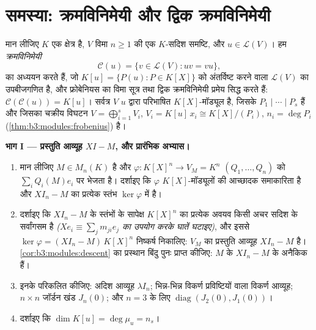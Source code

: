 \section{समस्या: क्रमविनिमेयी और द्विक क्रमविनिमेयी}

\begin{problem}\label{pb:b3:modules:1}
मान लीजिए $K$ एक क्षेत्र है, $V$ विमा $n \geq
1$ की एक
$K$-सदिश समष्टि, और $u \in \mathcal L(V)$। हम \emph{क्रमविनिमेयी}
\[
\mathcal C(u) = \{v \in \mathcal L(V) : uv = vu\},
\]
का अध्ययन करते हैं, जो $K[u] = \{P(u) : P \in
K[X]\}$ को अंतर्विष्ट करने वाला $\mathcal L(V)$ का
उपबीजगणित है, और फ्रोबेनियस का विमा सूत्र तथा द्विक क्रमविनिमेयी
प्रमेय सिद्ध करते हैं: $\mathcal C(\mathcal C(u)) = K[u]$। सर्वत्र $V$ $u$ द्वारा
परिभाषित $K[X]$-मॉड्यूल है, जिसके  $P_1 \mid \cdots \mid P_s$ हैं और
जिसका चक्रीय विघटन $V =
\bigoplus_{i=1}^s V_i$, $V_i = K[u]\,x_i \cong K[X]/(P_i)$, $n_i
= \deg P_i$ (\cref{thm:b3:modules:frobenius}) है।

\medskip
\noindent\textbf{भाग I --- प्रस्तुति आव्यूह $XI - M$, और प्रारंभिक
अभ्यास।}
\begin{enumerate}
  \item मान लीजिए $M \in M_n(K)$ है और $\varphi \colon K[X]^n \to V_M
        = K^n$ $(Q_1, \dots, Q_n)$ को $\sum_i Q_i(M)e_i$ पर भेजता है।
        दर्शाइए कि $\varphi$ $K[X]$-मॉड्यूलों की आच्छादक समाकारिता है
        और $XI_n - M$ का प्रत्येक स्तंभ $\ker\varphi$ में है।
  \item दर्शाइए कि $XI_n - M$ के स्तंभों के सापेक्ष $K[X]^n$ का प्रत्येक
        अवयव किसी अचर सदिश के सर्वांगसम है \emph{($Xe_i \equiv \sum_j m_{ji}e_j$ का उपयोग
        करके घातें घटाइए)}, और इससे $\ker\varphi = (XI_n - M)\,K[X]^n$ निष्कर्ष निकालिए:
         $V_M$ का प्रस्तुति आव्यूह $XI_n - M$ है। \cref{cor:b3:modules:descent} का
        प्रस्थान बिंदु पुनः प्राप्त कीजिए: $M$ के  $XI_n - M$ के अनैकिक  हैं।
  \item इनके  परिकलित कीजिए: अदिश आव्यूह $\lambda I_n$;
        भिन्न-भिन्न विकर्ण प्रविष्टियों वाला विकर्ण आव्यूह;
        $n \times n$ जॉर्डन खंड $J_n(0)$; और $n = 3$ के लिए $\operatorname{diag}(J_2(0), J_1(0))$।
  \item दर्शाइए कि $\dim K[u] = \deg \mu_u = n_s$।
\end{enumerate}


\end{problem}
